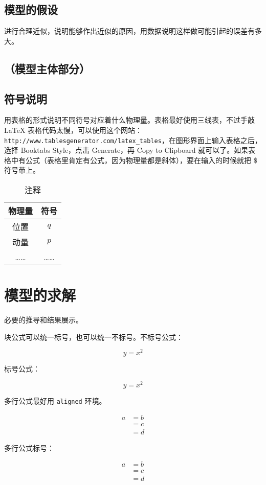 \documentclass{ctexart}
\begin{document}
\subsection{模型的假设}
进行合理近似，说明能够作出近似的原因，用数据说明这样做可能引起的误差有多大。
\subsection{（模型主体部分）}
\subsection{符号说明}
用表格的形式说明不同符号对应着什么物理量。表格最好使用三线表，不过手敲 LaTeX 表格代码太慢，可以使用这个网站：\verb|http://www.tablesgenerator.com/latex_tables|，在图形界面上输入表格之后，选择 Booktabs Style，点击 Generate，再 Copy to Clipboard 就可以了。如果表格中有公式（表格里肯定有公式，因为物理量都是斜体），要在输入的时候就把 \$ 符号带上。

\begin{table}[h]
\centering
\caption{注释}
\begin{tabular}{cc}
\toprule
物理量 & 符号  \\ \midrule
位置  & $q$ \\
动量  & $p$ \\
……  & ……  \\ \bottomrule
\end{tabular}
\end{table}
\newpage
\section{模型的求解}
必要的推导和结果展示。

块公式可以统一标号，也可以统一不标号。不标号公式：

$$
y=x^2
$$

标号公式：

\begin{equation}
y=x^2
\end{equation}

多行公式最好用 \verb|aligned| 环境。

$$
\begin{aligned}
a&=b\\
&=c\\
&=d
\end{aligned}
$$

多行公式标号：

\begin{equation}
\begin{aligned}
a&=b\\
&=c\\
&=d
\end{aligned}
\end{equation}
\end{document}
